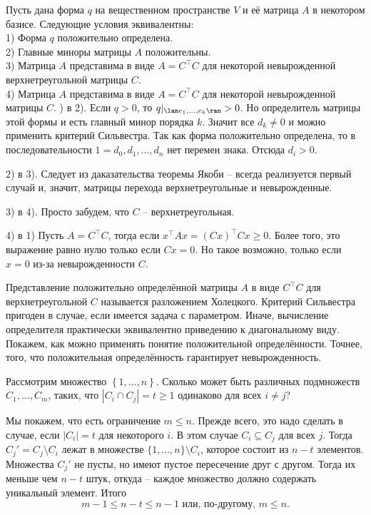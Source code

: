 \thrm
Пусть дана форма $q$ на вещественном пространстве $V$ и её матрица $A$ в некотором базисе. Следующие условия эквивалентны:\\
1) Форма $q$ положительно определена.\\
2) Главные миноры матрицы $A$ положительны.\\
3) Матрица $A$ представима в виде $A=C^{\top}C$ для некоторой невырожденной верхнетреугольной матрицы $C$.\\
4) Матрица $A$ представима в виде $A=C^{\top}C$ для некоторой невырожденной матрицы $C$.
) в 2). Если $q>0$, то $q|_{\lan e_1,\dots,e_k\ran} >0$. Но определитель матрицы этой формы и есть главный минор порядка $k$. Значит все $d_k \neq 0$ и можно применить критерий Сильвестра. Так как форма положительно определена, то  в последовательности $1=d_0,d_1,\dots,d_n$ нет перемен знака. Отсюда $d_i>0$.

2) в 3). Следует из даказательства теоремы Якоби -- всегда реализуется первый случай и, значит, матрицы перехода верхнетреугольные и невырожденные.

3) в 4). Просто забудем, что $C$ -- верхнетреугольная.

4) в 1)  Пусть $A=C^{\top}C$, тогда если $x^{\top}Ax=(Cx)^{\top}Cx\geq 0$. Более того, это выражение равно нулю только если $Cx=0$. Но такое возможно, только если $x=0$ из-за невырожденности $C$.
\endproof
\ethrm

Представление положительно определённой матрицы $A$ в виде $C^{\top}C$ для верхнетреугольной $C$ называется разложением Холецкого. Критерий Сильвестра пригоден в случае, если имеется задача с параметром. Иначе, вычисление определителя практически эквивалентно приведению к диагональному виду. Покажем, как можно применять понятие положительной определённости. Точнее, того, что положительная определённость гарантирует невырожденность.




\zd Рассмотрим множество $\left\{ 1,\dots, n\right\}$. Сколько может быть различных подмножеств $C_1,\dots,C_m$, таких, что $|C_i \cap C_j|=t\geq 1$ одинаково для всех $i \neq j$?
\ezd

Мы покажем, что есть ограничение $m\leq n$. Прежде всего, это надо сделать в случае, если $|C_i|=t$ для некоторого $i$. В этом случае $C_i \subseteq C_j$ для всех $j$. Тогда $C_j'=C_j\setminus C_i$ лежат в множестве $\{1,\dots,n\}\setminus C_i$, которое состоит из $n-t$ элементов. Множества $C_j'$ не пусты, но имеют пустое пересечение друг с другом. Тогда их меньше чем $n-t$ штук, откуда -- каждое множество должно содержать уникальный элемент. Итого
$$m-1\leq n-t \leq n-1 \text{ или, по-другому, } m \leq n.$$

